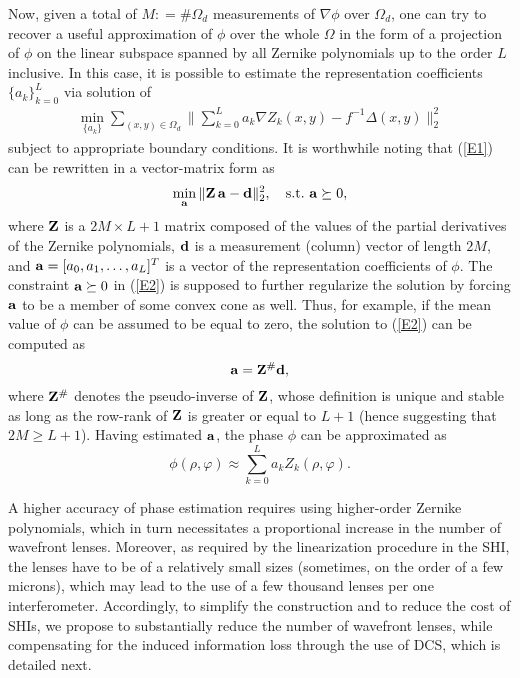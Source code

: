 \pdfoutput=1 \documentclass[journal]{IEEEtran}
\begin{document}
Now, given a total of $M : = \# \Omega_d$ measurements of $\nabla \phi$ over $\Omega_d$, one can try to recover a useful approximation of $\phi$ over the whole $\Omega$ in the form of a projection of $\phi$ on the linear subspace spanned by all Zernike polynomials up to the order $L$ inclusive. In this case, it is possible to estimate the representation coefficients $\{a_k\}_{k=0}^L$ via solution of
\begin{align} \label{E1}
\min_{\{a_k\}} \sum_{(x,y) \in \Omega_d} \big \| \sum_{k=0}^L a_k \nabla Z_k(x,y) - f^{-1} \Delta (x,y) \big\|_2^2
\end{align}
subject to appropriate boundary conditions. It is worthwhile noting that (\ref{E1}) can be rewritten in a vector-matrix form as
\begin{equation} \label{E2}
\min_{\bf a} \| {\bf Z} \, {\bf a}  - {\bf d} \|_2^2, \quad \mbox{s.t.} \,\, {\bf a} \succeq 0,
\end{equation}
where $\bf Z$ is a $2 M \times L+1$ matrix composed of the values of the partial derivatives of the Zernike polynomials, $\bf d$ is a measurement (column) vector of length $2 M$, and ${\bf a} = [a_0, a_1, \dots, a_L]^T$ is a vector of the representation coefficients of $\phi$. The constraint ${\bf a} \succeq 0$ in (\ref{E2}) is supposed to further regularize the solution by forcing $\bf a$ to be  a member of some convex cone as well. Thus, for example, if the mean value of $\phi$ can be assumed to be equal to zero, the solution to (\ref{E2}) can be computed as
\begin{equation}
{\bf a} = {\bf Z}^{\#} {\bf d},
\end{equation}
where ${\bf Z}^{\#}$ denotes the pseudo-inverse of $\bf Z$, whose definition is unique and stable as long as the row-rank of $\bf Z$ is greater or equal to $L+1$ (hence suggesting that $2 M \ge L+1$). Having estimated $\bf a$, the phase $\phi$ can be approximated as
\begin{equation}
\phi(\rho, \varphi) \approx \sum_{k=0}^L a_k Z_k(\rho, \varphi).
\end{equation}

A higher accuracy of phase estimation requires using higher-order Zernike polynomials, which in turn necessitates a proportional increase in the number of wavefront lenses. Moreover, as required by the linearization procedure in the SHI, the lenses have to be of a relatively small sizes (sometimes, on the order of a few microns), which may lead to the use of a few thousand lenses per one interferometer. Accordingly, to simplify the construction and to reduce the cost of SHIs, we propose to substantially reduce the number of wavefront lenses, while compensating for the induced information loss through the use of DCS, which is detailed next.
\end{document}
